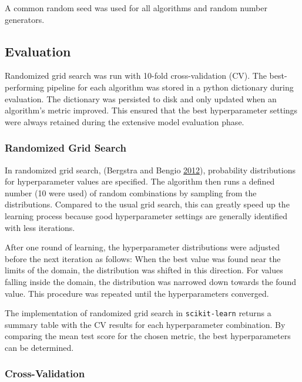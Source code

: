 \documentclass[
  11pt,
  a4paper,
  DIV=12,captions=tableheading,oneside,titlepage]{scrbook}
\begin{document}
A common random seed was used for all algorithms and random number generators.

\hypertarget{evaluation}{%
\subsection{Evaluation}\label{evaluation}}

Randomized grid search was run with 10-fold cross-validation (CV). The best-performing pipeline for each algorithm was stored in a python dictionary during evaluation. The dictionary was persisted to disk and only updated when an algorithm's metric improved. This ensured that the best hyperparameter settings were always retained during the extensive model evaluation phase.

\hypertarget{randomized-grid-search}{%
\subsubsection{Randomized Grid Search}\label{randomized-grid-search}}

In randomized grid search, (Bergstra and Bengio \protect\hyperlink{ref-bergstra2012random}{2012}), probability distributions for hyperparameter values are specified. The algorithm then runs a defined number (10 were used) of random combinations by sampling from the distributions. Compared to the usual grid search, this can greatly speed up the learning process because good hyperparameter settings are generally identified with less iterations.

After one round of learning, the hyperparameter distributions were adjusted before the next iteration as follows: When the best value was found near the limits of the domain, the distribution was shifted in this direction. For values falling inside the domain, the distribution was narrowed down towards the found value. This procedure was repeated until the hyperparameters converged.

The implementation of randomized grid search in \texttt{scikit-learn} returns a summary table with the CV results for each hyperparameter combination. By comparing the mean test score for the chosen metric, the best hyperparameters can be determined.

\hypertarget{cross-validation}{%
\subsubsection{Cross-Validation}\label{cross-validation}}
\end{document}
